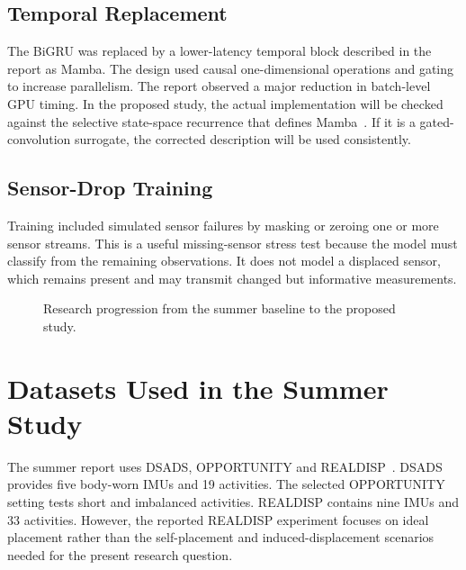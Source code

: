\documentclass[12pt,a4paper,twoside,openright]{report}
\begin{document}
\subsection{Temporal Replacement}
The BiGRU was replaced by a lower-latency temporal block described in the report as Mamba. The design used causal one-dimensional operations and gating to increase parallelism. The report observed a major reduction in batch-level GPU timing. In the proposed study, the actual implementation will be checked against the selective state-space recurrence that defines Mamba~\cite{mamba}. If it is a gated-convolution surrogate, the corrected description will be used consistently.

\subsection{Sensor-Drop Training}
Training included simulated sensor failures by masking or zeroing one or more sensor streams. This is a useful missing-sensor stress test because the model must classify from the remaining observations. It does not model a displaced sensor, which remains present and may transmit changed but informative measurements.

\begin{figure}[hbt!]
\centering
{}
\caption{Research progression from the summer baseline to the proposed study.}
\label{fig:progression}
\end{figure}

\section{Datasets Used in the Summer Study}
The summer report uses DSADS, OPPORTUNITY and REALDISP~\cite{summerreport}. DSADS provides five body-worn IMUs and 19 activities. The selected OPPORTUNITY setting tests short and imbalanced activities. REALDISP contains nine IMUs and 33 activities. However, the reported REALDISP experiment focuses on ideal placement rather than the self-placement and induced-displacement scenarios needed for the present research question.
\end{document}
